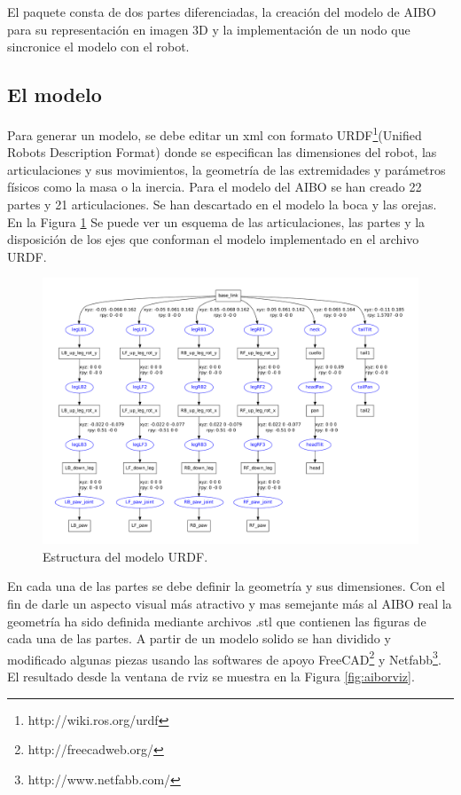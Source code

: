 \documentclass[12pt,a4paper,final,twoside]{book}
\begin{document}
El paquete consta de dos partes diferenciadas, la creación del modelo de AIBO para su representación en imagen 3D y la implementación de un nodo que sincronice el modelo con el robot.

\subsection{El modelo}
Para generar un modelo, se debe editar un xml con formato URDF\footnote{http://wiki.ros.org/urdf}(Unified Robots Description Format) donde se especifican las dimensiones del robot, las articulaciones y sus movimientos, la geometría de las extremidades y parámetros físicos como la masa o la inercia.
Para el modelo del AIBO se han creado 22 partes y 21 articulaciones. Se han descartado en el modelo la boca y las orejas. En la Figura \ref{fig:aibourdf} Se puede ver un esquema de las articulaciones, las partes y la disposición de los ejes que conforman el modelo implementado en el archivo URDF.

\begin{figure}[H]
	\centering
    \includegraphics[scale=0.39]{images/Aibo.pdf}
	 \caption{Estructura del modelo URDF.}
  \label{fig:aibourdf}
\end{figure}

En  cada una de las partes se debe definir la geometría y sus dimensiones. Con el fin de darle un aspecto visual más atractivo y mas semejante más al AIBO real la geometría ha sido  definida mediante archivos .stl que contienen las figuras de cada una de las partes. A partir de un modelo solido se han dividido y modificado algunas piezas usando las softwares de apoyo FreeCAD\footnote{http://freecadweb.org/} y Netfabb\footnote{http://www.netfabb.com/}. El resultado desde la ventana de rviz se muestra en la Figura \ref{fig:aiborviz}.
 
\end{document}
